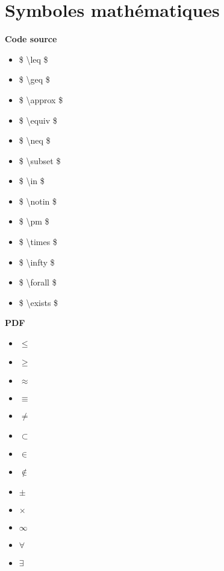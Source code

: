 \documentclass[a4paper,12pt]{article}
\begin{document}
\section{Symboles math\'ematiques}
\begin{minipage}[t]{8cm}	
\textbf{Code source}\\
\begin{itemize}
\item \$ \textbackslash leq \$
\item \$ \textbackslash geq \$
\item \$ \textbackslash approx \$
\item \$ \textbackslash equiv \$
\item \$ \textbackslash neq \$
\item \$ \textbackslash subset \$
\item\$ \textbackslash in \$
\item \$ \textbackslash notin \$
\item \$ \textbackslash pm \$
\item \$ \textbackslash times \$
\item \$ \textbackslash infty \$
\item \$ \textbackslash forall \$
\item \$ \textbackslash exists \$
\end{itemize}
\end{minipage}
\begin{minipage}[t]{8cm}
\textbf{PDF}\\
\begin{itemize}
\item $\leq$
\item $\geq$
\item $\approx$
\item $\equiv$
\item $\neq$
\item $\subset$
\item $\in$
\item $\notin$
\item $\pm$
\item $\times$
\item $\infty$
\item $\forall$
\item $\exists$
\end{itemize}
\end{minipage}
\end{document}
